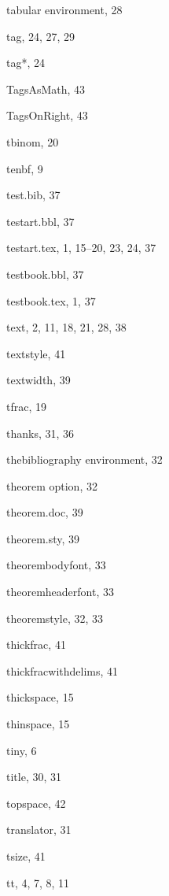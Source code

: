 \begin{theindex}
  \indexspace

  \item {\ptt {}tabular} environment, 28
  \item {\ptt \bslash tag}, 24, 27, 29
  \item {\ptt \bslash tag*}, 24
  \item {\ptt \bslash TagsAsMath}, 43
  \item {\ptt \bslash TagsOnRight}, 43
  \item {\ptt \bslash tbinom}, 20
  \item {\ptt \bslash tenbf}, 9
  \item {\ptt {}test.bib}, 37
  \item {\ptt {}testart.bbl}, 37
  \item {\ptt {}testart.tex}, 1, 15--20, 23, 24, 37
  \item {\ptt {}testbook.bbl}, 37
  \item {\ptt {}testbook.tex}, 1, 37
  \item {\ptt \bslash text}, 2, 11, 18, 21, 28, 38
  \item {\ptt \bslash textstyle}, 41
  \item {\ptt \bslash textwidth}, 39
  \item {\ptt \bslash tfrac}, 19
  \item {\ptt \bslash thanks}, 31, 36
  \item {\ptt {}thebibliography} environment, 32
  \item {\ptt {}theorem} option, 32
  \item {\ptt {}theorem.doc}, 39
  \item {\ptt {}theorem.sty}, 39
  \item {\ptt \bslash theorembodyfont}, 33
  \item {\ptt \bslash theoremheaderfont}, 33
  \item {\ptt \bslash theoremstyle}, 32, 33
  \item {\ptt \bslash thickfrac}, 41
  \item {\ptt \bslash thickfracwithdelims}, 41
  \item {\ptt \bslash thickspace}, 15
  \item {\ptt \bslash thinspace}, 15
  \item {\ptt \bslash tiny}, 6
  \item {\ptt \bslash title}, 30, 31
  \item {\ptt \bslash topspace}, 42
  \item {\ptt \bslash translator}, 31
  \item {\ptt \bslash tsize}, 41
  \item {\ptt \bslash tt}, 4, 7, 8, 11


\end{theindex}
